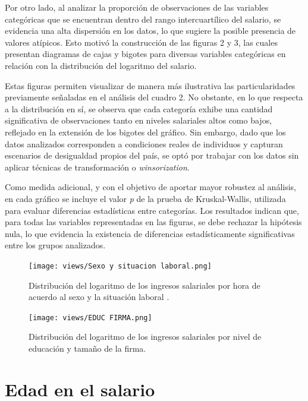 \documentclass[10pt]{article}
\begin{document}
Por otro lado, al analizar la proporción de observaciones de las variables categóricas que se encuentran dentro del rango intercuartílico del salario, se evidencia una alta dispersión en los datos, lo que sugiere la posible presencia de valores atípicos. Esto motivó la construcción de las figuras 2 y 3, las cuales presentan diagramas de cajas y bigotes para diversas variables categóricas en relación con la distribución del logaritmo del salario.

Estas figuras permiten visualizar de manera más ilustrativa las particularidades previamente señaladas en el análisis del cuadro 2. No obstante, en lo que respecta a la distribución en sí, se observa que cada categoría exhibe una cantidad significativa de observaciones tanto en niveles salariales altos como bajos, reflejado en la extensión de los bigotes del gráfico. Sin embargo, dado que los datos analizados corresponden a condiciones reales de individuos y capturan escenarios de desigualdad propios del país, se optó por trabajar con los datos sin aplicar técnicas de transformación o  \textit{winsorization}.

Como medida adicional, y con el objetivo de aportar mayor robustez al análisis, en cada gráfico se incluye el valor  \textit{p} de la prueba de Kruskal-Wallis, utilizada para evaluar diferencias estadísticas entre categorías. Los resultados indican que, para todas las variables representadas en las figuras, se debe rechazar la hipótesis nula, lo que evidencia la existencia de diferencias estadísticamente significativas entre los grupos analizados.

\begin{figure}[H]  
    \centering
    \texttt{[image: views/Sexo y situacion laboral.png]} %
    \caption{Distribución del logaritmo de los ingresos salariales por hora de acuerdo al sexo y la situación laboral .}
    \label{fig: Gráfico 2}  %
\end{figure}
\begin{figure}[H]  
    \centering
    \texttt{[image: views/EDUC FIRMA.png]}
    \caption{Distribución del logaritmo de los ingresos salariales por nivel de educación y tamaño de la firma.}
    \label{fig: Gráfico 3}  %
\end{figure}


\section{Edad en el salario}
\end{document}
